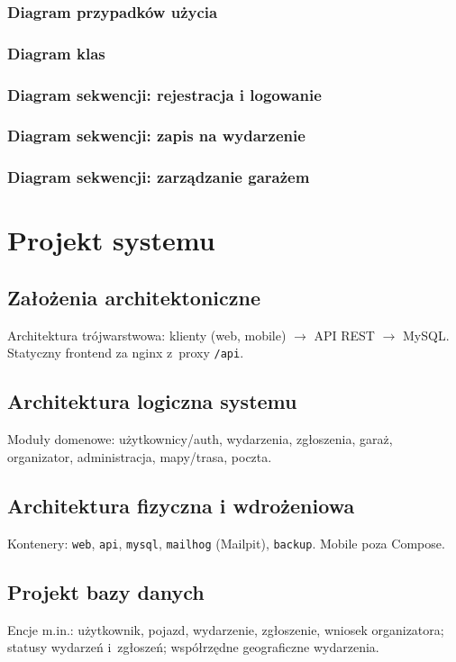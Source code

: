 \documentclass{sprz}
\begin{document}
\subsection{Diagram przypadków użycia}
\subsection{Diagram klas}
\subsection{Diagram sekwencji: rejestracja i logowanie}
\subsection{Diagram sekwencji: zapis na wydarzenie}
\subsection{Diagram sekwencji: zarządzanie garażem}

\chapter{Projekt systemu}
\section{Założenia architektoniczne}
Architektura trójwarstwowa: klienty (web, mobile) $\rightarrow$ API REST $\rightarrow$ MySQL. Statyczny frontend za nginx z~proxy \texttt{/api}.

\section{Architektura logiczna systemu}
Moduły domenowe: użytkownicy/auth, wydarzenia, zgłoszenia, garaż, organizator, administracja, mapy/trasa, poczta.

\section{Architektura fizyczna i wdrożeniowa}
Kontenery: \texttt{web}, \texttt{api}, \texttt{mysql}, \texttt{mailhog} (Mailpit), \texttt{backup}. Mobile poza Compose.

\section{Projekt bazy danych}
Encje m.in.: użytkownik, pojazd, wydarzenie, zgłoszenie, wniosek organizatora; statusy wydarzeń i~zgłoszeń; współrzędne geograficzne wydarzenia.
\end{document}

